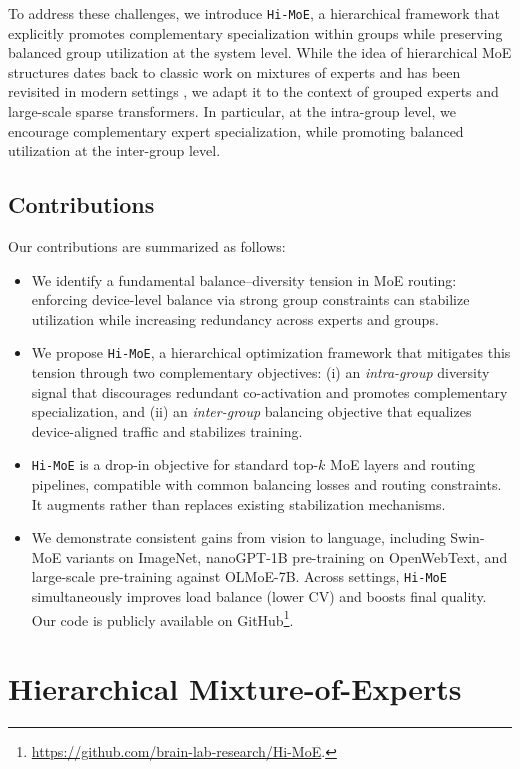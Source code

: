 \documentclass[sigconf,nonacm]{acmart}
\begin{document}
To address these challenges, we introduce \texttt{Hi-MoE}, a hierarchical framework that explicitly promotes complementary specialization within groups while preserving balanced group utilization at the system level.
While the idea of hierarchical MoE structures dates back to classic work on mixtures of experts \citep{jordan1994hierarchical} and has been revisited in modern settings \citep{hierarchical2, nguyen2024expert}, we adapt it to the context of grouped experts and large-scale sparse transformers.
In particular, at the intra-group level, we encourage complementary expert specialization, while promoting balanced utilization at the inter-group level.

\subsection*{Contributions}
Our contributions are summarized as follows:
\begin{itemize}
  \item We identify a fundamental balance--diversity tension in MoE routing: enforcing device-level balance via strong group constraints can stabilize utilization while increasing redundancy across experts and groups.

  \item We propose \texttt{Hi-MoE}, a hierarchical optimization framework that mitigates this tension through two complementary objectives: (i) an \emph{intra-group} diversity signal that discourages redundant co-activation and promotes complementary specialization, and (ii) an \emph{inter-group} balancing objective that equalizes device-aligned traffic and stabilizes training.

  \item \texttt{Hi-MoE} is a drop-in objective for standard top-$k$ MoE layers and routing pipelines, compatible with common balancing losses and routing constraints. It augments rather than replaces existing stabilization mechanisms.
\setcounter{footnote}{0}
  \item We demonstrate consistent gains from vision to language, including Swin-MoE variants on ImageNet, nanoGPT-1B pre-training on OpenWebText, and large-scale pre-training against OLMoE-7B. Across settings, \texttt{Hi-MoE} simultaneously improves load balance (lower CV) and boosts final quality. Our code is publicly available on GitHub\footnote{\url{https://github.com/brain-lab-research/Hi-MoE}.}.
\end{itemize}


\section{Hierarchical Mixture-of-Experts}
\end{document}
